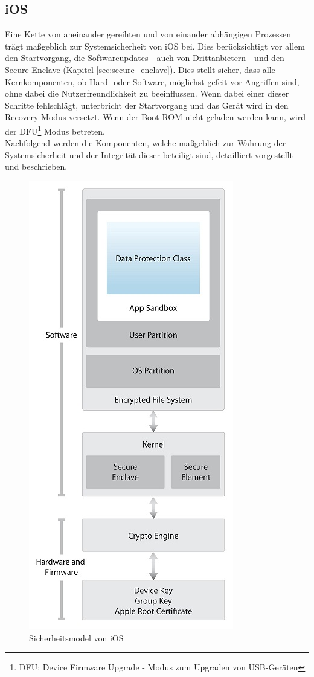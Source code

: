 \subsection{iOS}\label{sec:components-syssec} 
	Eine Kette von aneinander gereihten und von einander abhängigen Prozessen trägt
	maßgeblich zur Systemsicherheit von iOS bei. Dies berücksichtigt vor allem den
	Startvorgang, die Softwareupdates - auch von Drittanbietern - und den Secure
	Enclave (Kapitel \ref{sec:secure_enclave}). Dies stellt sicher, dass
	alle Kernkomponenten, ob Hard- oder Software, möglichst gefeit vor Angriffen sind,
	ohne dabei die Nutzerfreundlichkeit zu beeinflussen. Wenn dabei einer dieser
	Schritte fehlschlägt, unterbricht der Startvorgang und das Gerät wird in den
	Recovery Modus versetzt. Wenn der Boot-ROM nicht geladen werden kann, wird der
	DFU\footnote{DFU: Device Firmware Upgrade - Modus zum Upgraden von USB-Geräten}
	Modus betreten.\\
	Nachfolgend werden die Komponenten, welche maßgeblich zur Wahrung der
	Systemsicherheit und der Integrität dieser beteiligt sind, detailliert
	vorgestellt und beschrieben.
	
	\begin{figure}[h]
		\centering
		\includegraphics[width=0.4\linewidth]{ios/media/security-model.jpg}
		\caption{Sicherheitsmodel von iOS 
		\cite[S.4]{iOSSecurityApr2015}}
		\label{fig:security-model}
	\end{figure}


